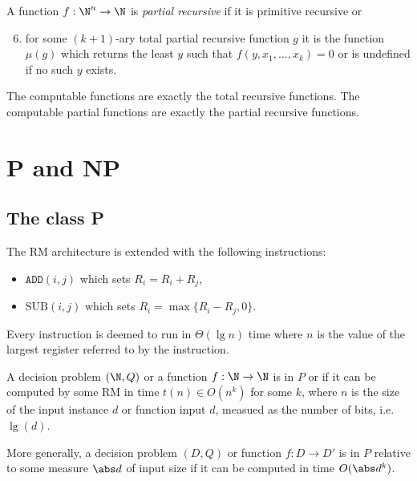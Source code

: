 \documentclass{article}
\begin{document}
\begin{definition*}
	A function $f:\N^n\to\N$ is \emph{partial recursive} if it is primitive recursive or
	\begin{enumerate}[label=R\arabic*.]
		\setcounter{enumi}{5}
		\item for some $(k+1)$-ary total partial recursive function $g$ it is the function $\mu(g)$
		      which returns the least $y$ such that $f(y,x_1,...,x_k)=0$ or is undefined if no such $y$
		      exists.
	\end{enumerate}
\end{definition*}

\begin{theorem*}[Notes I.45]
	The computable functions are exactly the total recursive functions. The computable partial functions
	are exactly the partial recursive functions.
\end{theorem*}

\section{P and NP}

\subsection{The class P}

\begin{definition*}
	The RM architecture is extended with the following instructions:
	\begin{itemize}
		\item $\texttt{ADD}(i,j)$ which sets $R_i=R_i+R_j$,
		\item $\text{SUB}(i,j)$ which sets $R_i=\max\{R_i-R_j,0\}$.
	\end{itemize}
	Every instruction is deemed to run in $\Theta(\lg n)$ time where $n$
	is the value of the largest register referred to by the instruction.
\end{definition*}


\begin{definition*}
	A decision problem $(\N,Q)$ or a function $f:\N\to\N$ is in $P$ or \ptime if
	it can be computed by some RM in time $t(n)\in O(n^k)$ for some $k$, where $n$ is the size
	of the input instance $d$ or function input $d$, measued as the number of bits, i.e. $\lg(d)$.

	More generally, a decision problem $(D,Q)$ or function $f:D\to D'$ is in $P$ relative to some
	measure $\abs d$ of input size if it can be computed in time $O(\abs d^k)$.
\end{definition*}
\end{document}
